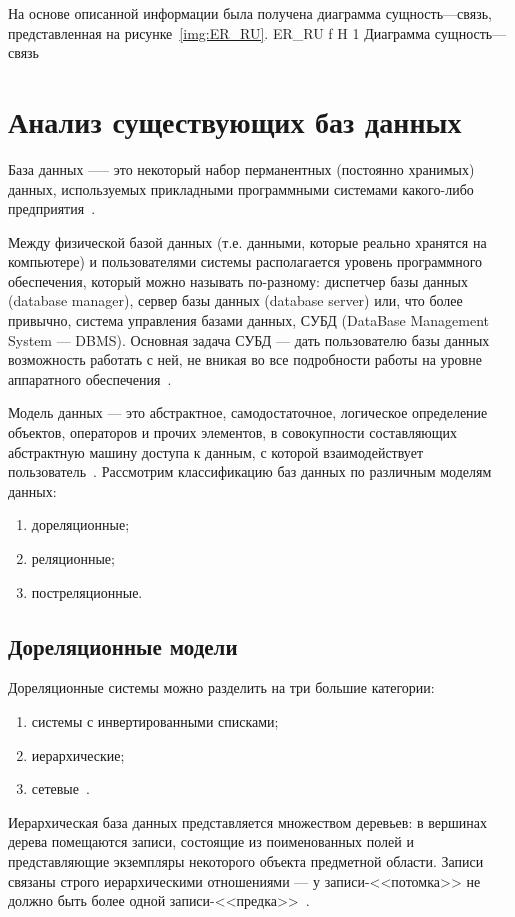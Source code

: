 \newpage
На основе описанной информации была получена диаграмма сущность---связь, представленная на рисунке~\ref{img:ER_RU}.
{ER_RU} %
{f} %
{H} %
{1\textwidth} %
{Диаграмма сущность---связь} %


\section{Анализ существующих баз данных}
База данных —-- это некоторый набор перманентных (постоянно хранимых) данных, используемых прикладными программными системами какого-либо предприятия~\cite{williams-db}.

Между физической базой данных (т.е. данными, которые реально хранятся на компьютере) и пользователями системы располагается уровень программного
обеспечения, который можно называть по-разному: диспетчер базы данных (database 
manager), сервер базы данных (database server) или, что более привычно, система управления базами данных, СУБД (DataBase Management System — DBMS).
Основная задача СУБД --- дать пользователю базы данных возможность работать с ней, не вникая во все подробности работы на уровне аппаратного обеспечения~\cite{williams-db}.

Модель данных — это абстрактное, самодостаточное, логическое определение объектов, операторов и прочих элементов, в совокупности составляющих абстрактную машину доступа к данным, с которой взаимодействует пользователь~\cite{williams-db}.
Рассмотрим классификацию баз данных по различным моделям данных:
\begin{enumerate}
	\item дореляционные;
	\item реляционные;
	\item постреляционные.
\end{enumerate}

\subsection{Дореляционные модели}
Дореляционные системы можно разделить на три большие категории:
\begin{enumerate}
	\item системы с инвертированными списками;
	\item иерархические;
	\item сетевые~\cite{williams-db}.
\end{enumerate}
Иерархическая база данных представляется множеством 
деревьев: в вершинах дерева помещаются записи, состоящие из поименованных 
полей и представляющие экземпляры некоторого объекта предметной области. 
Записи связаны строго иерархическими отношениями --- у записи-<<потомка>> не 
должно быть более одной записи-<<предка>>~\cite{wolf-db}.

